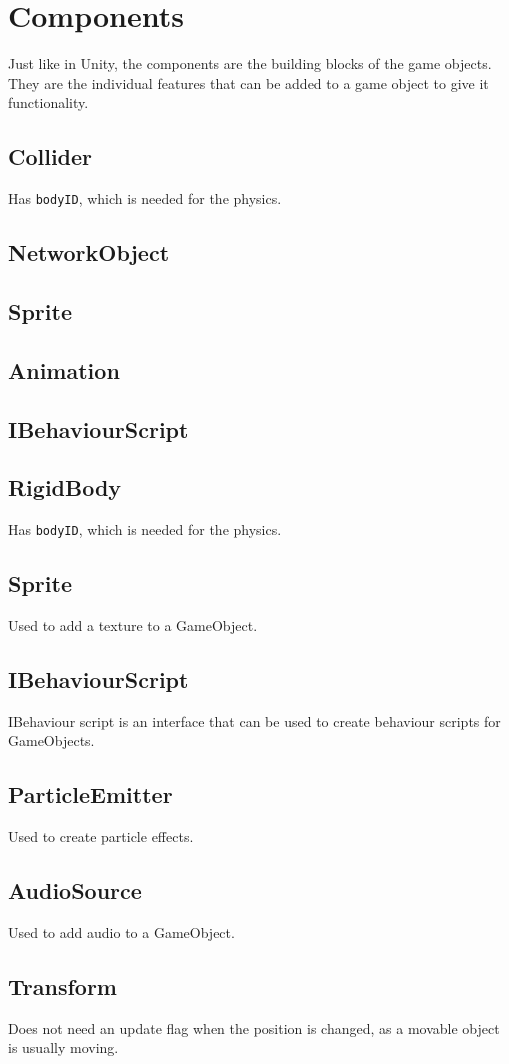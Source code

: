 \section{Components}
Just like in Unity, the components are the building blocks of the game objects.
They are the individual features that can be added to a game object to give it functionality.

\subsection{Collider}
Has \texttt{bodyID}, which is needed for the physics.

\subsection{NetworkObject}

\subsection{Sprite}

\subsection{Animation}

\subsection{IBehaviourScript}

\subsection{RigidBody}
Has \texttt{bodyID}, which is needed for the physics.

\subsection{Sprite}
Used to add a texture to a GameObject.

\subsection{IBehaviourScript}
IBehaviour script is an interface that can be used to create behaviour scripts for GameObjects.

\subsection{ParticleEmitter}
Used to create particle effects.

\subsection{AudioSource}
Used to add audio to a GameObject.
\subsection{Transform}

Does not need an update flag when the position is changed, as a movable object is usually moving.


